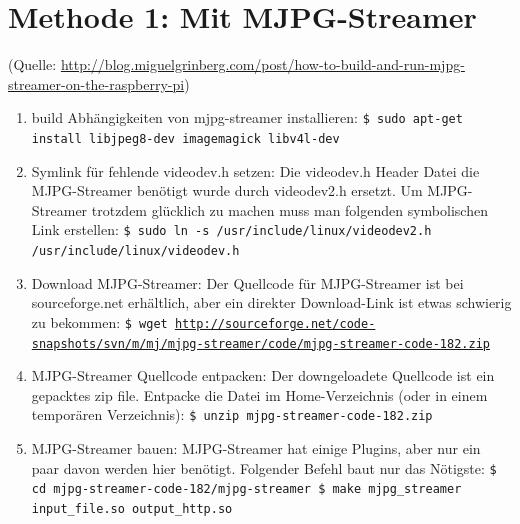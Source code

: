 \documentclass[12pt,a4paper,titlepage]{scrartcl} %
\begin{document}
\section{Methode 1: Mit MJPG-Streamer}
\small{(Quelle: \href{http://blog.miguelgrinberg.com/post/how-to-build-and-run-mjpg-streamer-on-the-raspberry-pi}{http://blog.miguelgrinberg.com/post/how-to-build-and-run-mjpg-streamer-on-the-raspberry-pi})}
\normalsize
\begin{enumerate}
\bfseries %

\item build Abhängigkeiten von mjpg-streamer installieren:\newline
\texttt{\$ sudo apt-get install libjpeg8-dev imagemagick libv4l-dev}

\item Symlink für fehlende videodev.h setzen:\newline
\textnormal{Die videodev.h Header Datei die MJPG-Streamer benötigt wurde durch \mbox{videodev2.h} ersetzt. Um MJPG-Streamer trotzdem glücklich zu machen muss man folgenden symbolischen Link erstellen:}\newline
\texttt{\$ sudo ln -s /usr/include/linux/videodev2.h /usr/include/linux/videodev.h}

\item Download MJPG-Streamer:\newline
\textnormal{Der Quellcode für MJPG-Streamer ist bei sourceforge.net erhältlich, aber ein direkter Download-Link ist etwas schwierig zu bekommen:}\newline
\texttt{\$ wget \url{http://sourceforge.net/code-snapshots/svn/m/mj/mjpg-streamer/code/mjpg-streamer-code-182.zip}}

\item MJPG-Streamer Quellcode entpacken:\newline
\textnormal{Der downgeloadete Quellcode ist ein gepacktes zip file. Entpacke die Datei im Home-Verzeichnis (oder in einem temporären Verzeichnis):}\newline
\texttt{\$ unzip mjpg-streamer-code-182.zip}

\item MJPG-Streamer bauen:\newline
\textnormal{MJPG-Streamer hat einige Plugins, aber nur ein paar davon werden hier benötigt. Folgender Befehl baut nur das Nötigste:}\newline
\texttt{\$ cd mjpg-streamer-code-182/mjpg-streamer\newline
\$ make mjpg\_streamer input\_file.so output\_http.so}


\end{enumerate}
\end{document}
